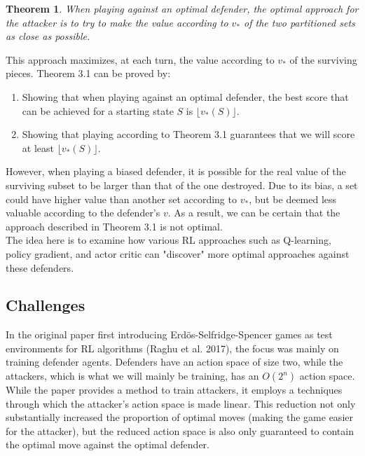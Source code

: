 \documentclass{article}
\theoremstyle{plain}
\newtheorem{thm}{Theorem}[section]
\theoremstyle{definition}
\theoremstyle{remark}
\newcommand{\floor}[1]{\lfloor #1 \rfloor}
\begin{document}
\begin{thm}
  When playing against an optimal defender, the optimal approach for the attacker is to try to make the value according to $v_{*}$ of the two partitioned sets as close as possible.
\end{thm}

This approach maximizes, at each turn, the value according to $v_{*}$ of the surviving pieces. Theorem 3.1 can be proved by:
\begin{enumerate}
  \item Showing that when playing against an optimal defender, the best score that can be achieved for a starting state $S$ is $\floor{v_{*}(S)}$.
  \item Showing that playing according to Theorem 3.1 guarantees that we will score at least $\floor{v_{*}(S)}$.
\end{enumerate}

However, when playing a biased defender, it is possible for the real value of the surviving subset to be larger than that of the one destroyed. Due to its bias, a set could have higher value than another set according to $v_{*}$, but be deemed less valuable according to the defender's $v$. As a result, we can be certain that the approach described in Theorem 3.1 is not optimal.\\

The idea here is to examine how various RL approaches such as Q-learning, policy gradient, and actor critic can "discover" more optimal approaches against these defenders.

\subsection{Challenges}
In the original paper first introducing Erd\"os-Selfridge-Spencer games as test environments for RL algorithms (Raghu et al. 2017), the focus was mainly on training defender agents. Defenders have an action space of size two, while the attackers, which is what we will mainly be training, has an $O(2^n)$ action space.\\

While the paper provides a method to train attackers, it employs a techniques through which the attacker's action space is made linear. This reduction not only substantially increased the proportion of optimal moves (making the game easier for the attacker), but the reduced action space is also only guaranteed to contain the optimal move against the optimal defender. \\
\end{document}
